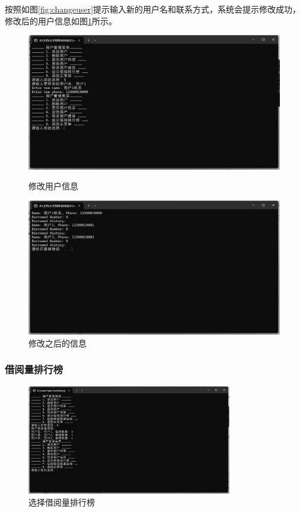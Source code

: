 \documentclass[12pt,twoside]{ctexart}
\begin{document}
按照如图\ref{fig:changeuser}提示输入新的用户名和联系方式，系统会提示修改成功，
修改后的用户信息如图\ref{fig:changesuccess}所示。
\begin{figure}[H]
    \centering
    \begin{minipage}{0.48\textwidth}
        \centering
        \includegraphics[width=\linewidth]{changeuser.png}
        \caption{修改用户信息}
        \label{fig:changeuser}
    \end{minipage}
    \hfill
    \begin{minipage}{0.48\textwidth}
        \centering
        \includegraphics[width=\linewidth]{changed.png}
        \caption{修改之后的信息}
        \label{fig:changesuccess}
    \end{minipage}
\end{figure}

\subsubsection{借阅量排行榜}

\begin{figure}[H]
    \centering
    \includegraphics[width=0.8\textwidth]{UserRank.png}
    \caption{选择借阅量排行榜}
\end{figure}
\end{document}
